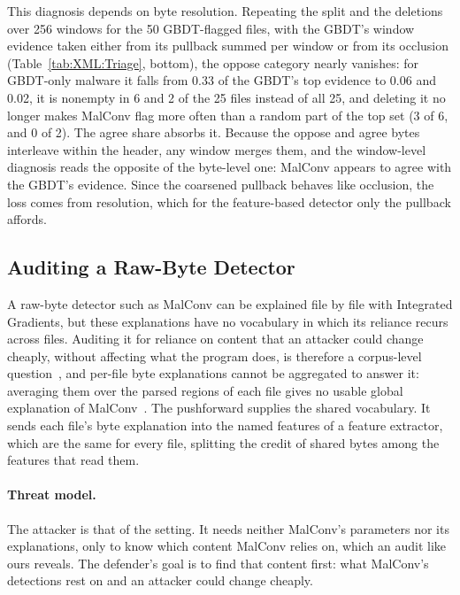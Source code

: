 This diagnosis depends on byte resolution. Repeating the split and the deletions over 256 windows for the 50
GBDT-flagged files, with the GBDT's window evidence taken either from its pullback summed per window or from its
occlusion (Table~\ref{tab:XML:Triage}, bottom), the oppose category nearly vanishes: for GBDT-only malware it falls from
0.33 of the GBDT's top evidence to 0.06 and 0.02, it is nonempty in 6 and 2 of the 25 files instead of all 25, and
deleting it no longer makes MalConv flag more often than a random part of the top set (3 of 6, and 0 of 2). The agree
share absorbs it. Because the oppose and agree bytes interleave within the header, any window merges them, and the
window-level diagnosis reads the opposite of the byte-level one: MalConv appears to agree with the GBDT's evidence.
Since the coarsened pullback behaves like occlusion, the loss comes from resolution, which for the feature-based
detector only the pullback affords.

\subsection{Auditing a Raw-Byte Detector}
\label{sec:XML:Audit}

A raw-byte detector such as MalConv can be explained file by file with Integrated Gradients, but these explanations
have no vocabulary in which its reliance recurs across files. Auditing it
for reliance on content that an attacker could change cheaply, without affecting what the program does, is therefore a
corpus-level question~\cite{arp2022and}, and per-file byte explanations cannot be aggregated to answer it: averaging
them over the parsed regions of each file gives no usable global explanation of MalConv~\cite{aryal2024explainability}. The
pushforward supplies the shared vocabulary. It sends each file's byte explanation into the named features of a feature
extractor, which are the same for every file, splitting the credit of shared bytes among the features that read them.

\paragraph{Threat model.} The attacker is that of the setting. It needs neither MalConv's parameters nor its
explanations, only to know which content MalConv relies on, which an audit like ours reveals. The defender's goal is to
find that content first: what MalConv's detections rest on and an attacker could change cheaply.

